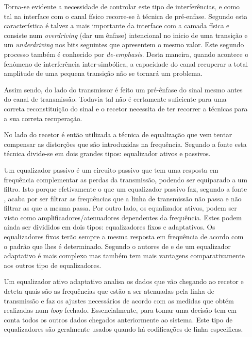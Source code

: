 Torna-se evidente a necessidade de controlar este tipo de interferências, e como tal na interface com o canal físico recorre-se à técnica de pré-enfase. Segundo \cite{R032} esta característica é talvez a  mais importante da interface com a camada física e consiste num \textit{overdriving} (dar um ênfase) intencional no inicio de uma transição e um \textit{underdriving} nos bits seguintes que apresentem o mesmo valor. Este segundo processo também é conhecido por \textit{de-emphasis}. Desta maneira, quando acontece o fenómeno de interferência inter-simbólica, a capacidade do canal recuperar a total amplitude de uma pequena transição não se tornará um problema.

Assim sendo, do lado do transmissor é feito um pré-ênfase do sinal mesmo antes do canal de transmissão. Todavia tal não é certamente suficiente para uma correta reconstituição do sinal e o recetor necessita de ter recorrer a técnicas para a sua correta recuperação.

No lado do recetor é então utilizada a técnica de equalização que vem tentar compensar as distorções que são introduzidas na frequência. Segundo a fonte \cite{R032} esta técnica divide-se em dois grandes tipos: equalizador ativos e passivos.

Um equalizador passivo é um circuito passivo que tem uma resposta em frequência complementar as perdas da transmissão, podendo ser equiparado a um filtro. Isto porque efetivamente o que um equalizador passivo faz, segundo a fonte \cite{R032}, acaba por ser filtrar as frequências que a linha de transmissão não passa e não filtrar as que a mesma passa. Por outro lado, os equalizador ativos, podem ser visto como amplificadores/atenuadores dependentes da frequência. Estes podem ainda ser divididos em dois tipos: equalizadores fixos e adaptativos. Os equalizadores fixos  terão sempre a mesma resposta em frequência de acordo com o padrão que lhes é determinado. Segundo o autores de \cite{R012} e de \cite{R032} um equalizador adaptativo é mais complexo mas também tem mais vantagens comparativamente aos outros tipo de equalizadores.

Um equalizador ativo adaptativo analisa os dados que vão chegando ao recetor e deteta quais são as frequências que estão a ser atenuadas pela linha de transmissão e faz os ajustes necessários de acordo com as medidas que obtém realizadas num \textit{loop} fechado. Essencialmente, para tomar uma decisão tem em conta todos os outros dados chegados anteriormente ao sistema. Este tipo de equalizadores são geralmente usados quando há codificações de linha especificas.
%

